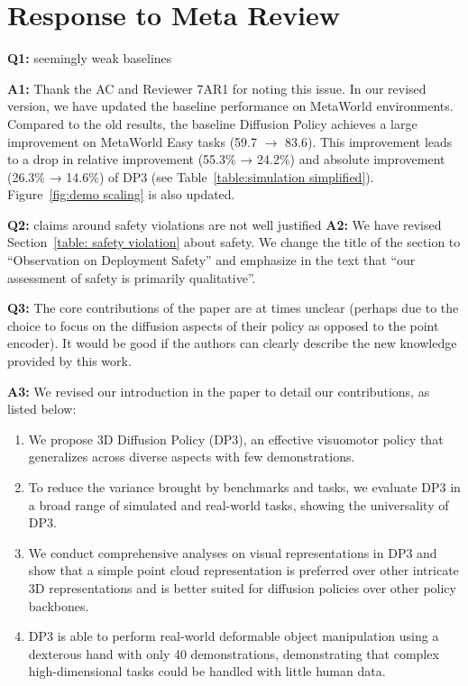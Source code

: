 \section*{Response to Meta Review}
\noindent\textbf{Q1:} seemingly weak baselines

\noindent\textbf{A1:} Thank the AC and Reviewer 7AR1 for noting this issue. In our revised version, we have updated the baseline performance on MetaWorld environments. Compared to the old results, the baseline Diffusion Policy achieves a large improvement on MetaWorld Easy tasks (59.7 $\rightarrow$ 83.6). This improvement leads to a drop in relative improvement (55.3\% → 24.2\%) and absolute improvement (26.3\% → 14.6\%) of DP3 (see Table~\ref{table:simulation simplified}). Figure~\ref{fig:demo scaling} is also updated.

\vspace{0.1in}

\noindent\textbf{Q2:} claims around safety violations are not well justified
\noindent\textbf{A2:} We have revised Section~\ref{table: safety violation} about safety. We change the title of the section to “Observation on Deployment Safety” and emphasize in the text that “our assessment of safety is primarily qualitative”.

\vspace{0.1in}

\noindent\textbf{Q3:} The core contributions of the paper are at times unclear (perhaps due to the choice to focus on the diffusion aspects of their policy as opposed to the point encoder). It would be good if the authors can clearly describe the new knowledge provided by this work.

\noindent\textbf{A3:} We revised our introduction in the paper to detail our contributions, as listed below:
\begin{enumerate}
    \item We propose 3D Diffusion Policy (DP3), an effective visuomotor policy that generalizes across diverse aspects with few demonstrations.
    \item To reduce the variance brought by benchmarks and tasks, we evaluate DP3 in a broad range of simulated and real-world tasks, showing the universality of DP3.
    \item We conduct comprehensive analyses on visual representations in DP3 and show that a simple point cloud representation is preferred over other intricate 3D representations and is better suited for diffusion policies over other policy backbones.
    \item DP3 is able to perform real-world deformable object manipulation using a dexterous hand with only 40 demonstrations, demonstrating that complex high-dimensional tasks could be handled with little human data.
\end{enumerate}

